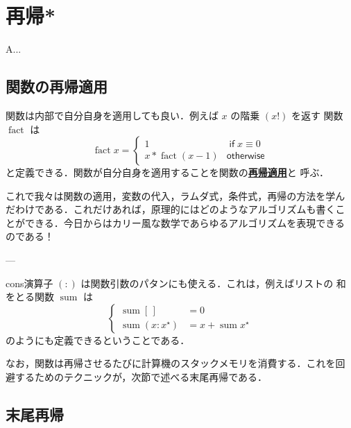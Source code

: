 \documentclass[a5paper,twoside,fleqn]{jsbook}
\newenvironment{leader}{\begingroup\gt}{\endgroup}
\newcommand{\keyword}[1]{{\underline{\textbf{#1}}}}
\newcommand{\mKeyword}[1]{\mathsf{#1}} %
\newcommand{\mIfKeyword}{\mKeyword{if}}
\newcommand{\mOtherwiseKeyword}{\mKeyword{otherwise}}
\DeclareMathOperator{\mIf}{\mIfKeyword}
\DeclareMathOperator{\mOtherwise}{\mOtherwiseKeyword}
\newcommand{\mEmptyList}{{[\,]}}
\newcommand{\mSpecialFunc}[1]{\mathrm{#1}}
\DeclareMathOperator{\mFact}{\mSpecialFunc{fact}}
\DeclareMathOperator{\mSum}{\mSpecialFunc{sum}}
\newcommand{\mList}[1]{{#1}^\mathrm{\star}}
\begin{document}
\chapter{再帰*}
\label{ch:recursion}

\begin{leader}
A...
\end{leader}


\section{関数の再帰適用}

関数は内部で自分自身を適用しても良い．例えば $x$ の階乗 $(x!)$ を返す
関数 $\mFact$ は
\begin{equation}
\mFact x=\begin{cases} 1&\mIf x\equiv0\\ x*\mFact(x-1)&\mOtherwise
\end{cases}
\end{equation}
と定義できる．関数が自分自身を適用することを関数の\keyword{再帰適用}と
呼ぶ．

これで我々は関数の適用，変数の代入，ラムダ式，条件式，再帰の方法を学ん
だわけである．これだけあれば，原理的にはどのようなアルゴリズムも書くこ
とができる．今日からはカリー風な数学であらゆるアルゴリズムを表現できる
のである！

---

cons演算子 $(:)$ は関数引数のパタンにも使える．これは，例えばリストの
和をとる関数 $\mSum$ は
\begin{equation}
\left\{
\begin{aligned}
\mSum\mEmptyList&=0\\ \mSum(x:\mList{x})&=x+\mSum\mList{x}
\end{aligned}
\right.
\end{equation}
のようにも定義できるということである．

なお，関数は再帰させるたびに計算機のスタックメモリを消費する．これを回
避するためのテクニックが，次節で述べる末尾再帰である．

\section{末尾再帰}
\end{document}
